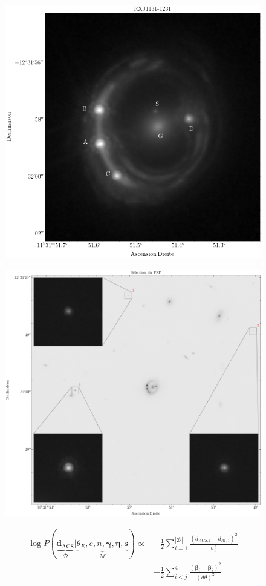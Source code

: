 \documentclass[times,10pt,twocolumn]{article}
\begin{document}
\begin{figure}[H]
        \centering
        \includegraphics[width=0.8\linewidth]{good_cutout}
        \caption{}
        \label{fig:rxj1131}
\end{figure}

\begin{figure}[H]
        \centering
        \includegraphics[width=0.8\linewidth]{psf_cutout}
        \caption{}
        \label{fig:psf}
\end{figure}



\begin{align}
        \nonumber
        \log P(\underbrace{\mathbf{d}_{\mathrm{ACS}}}_{\mathcal{D}}
        | \underbrace{\theta_E, e, n, \boldsymbol{\gamma}, \mathbf{\eta}, \mathbf{s}}_{\mathcal{M}}) \propto  
        &-\frac{1}{2}\sum_{i=1}^{|\mathcal{D}|} \frac{(d_{ACS,i} - d_{\mathcal{M}, i})^{2}}{\sigma_i^2}
        \\
\label{eq:Inference} 
        &-\frac{1}{2}\sum_{i < j}^{4} \frac{(\boldsymbol{\beta}_{i} - \boldsymbol{\beta}_i)^{2}}{(d\theta)^{2}}
\end{align} 
\end{document}
